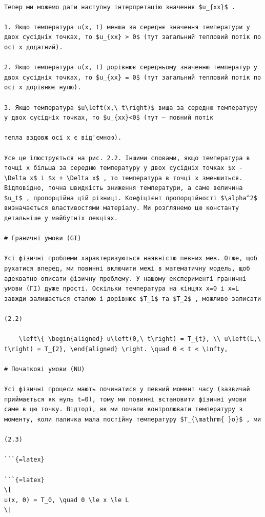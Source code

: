 \documentclass[
  ukrainian,
]{article}
\begin{document}
\begin{verbatim}

Тепер ми можемо дати наступну інтерпретацію значення $u_{xx}$ .

1. Якщо температура u(x, t) менша за середнє значення температури у двох сусідніх точках, то $u_{xx} > 0$ (тут загальний тепловий потік по осі x додатний).

2. Якщо температура u(x, t) дорівнює середньому значенню температур у двох сусідніх точках, то $u_{xx} = 0$ (тут загальний тепловий потік по осі x дорівнює нулю).

3. Якщо температура $u\left(x,\ t\right)$ вища за середню температуру у двох сусідніх точках, то $u_{xx}<0$ (тут — повний потік

тепла вздовж осі x є від'ємною).

Усе це ілюструється на рис. 2.2. Іншими словами, якщо температура в точці x більша за середню температуру у двох сусідніх точках $x - \Delta x$ і $x + \Delta x$ , то температура в точці x зменшиться. Відповідно, точна швидкість зниження температури, а саме величина $u_t$ , пропорційна цій різниці. Коефіцієнт пропорційності $\alpha^2$ визначається властивостями матеріалу. Ми розглянемо цю константу детальніше у майбутніх лекціях.

# Граничні умови (GI)

Усі фізичні проблеми характеризуються наявністю певних меж. Отже, щоб рухатися вперед, ми повинні включити межі в математичну модель, щоб адекватно описати фізичну проблему. У нашому експерименті граничні умови (ГІ) дуже прості. Оскільки температура на кінцях x=0 і x=L завжди залишається сталою і дорівнює $T_1$ та $T_2$ , можливо записати

(2.2)

    \left\{ \begin{aligned} u\left(0,\ t\right) = T_{t}, \\ u\left(L,\ t\right) = T_{2}, \end{aligned} \right. \quad 0 < t < \infty,

# Початкові умови (NU)

Усі фізичні процеси мають починатися у певний момент часу (зазвичай приймається як нуль t=0), тому ми повинні встановити фізичні умови саме в цю точку. Відтоді, як ми почали контролювати температуру з моменту, коли паличка мала постійну температуру $T_{\mathrm{ }o}$ , ми

(2.3)

```{=latex}

```{=latex}
\[
u(x, 0) = T_0, \quad 0 \le x \le L
\]
\end{verbatim}
\end{document}
